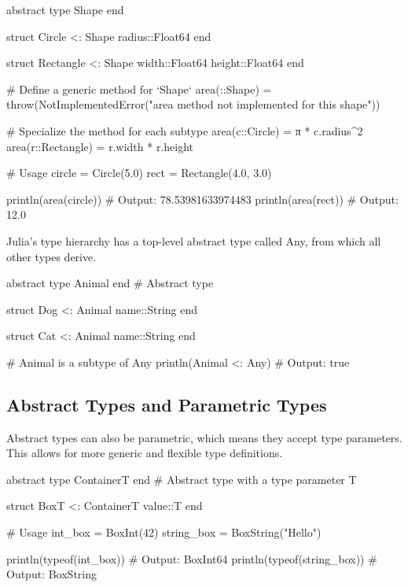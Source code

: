 \documentclass{report}
\begin{document}
     \bigbreak \noindent 
     \begin{jlcode}
 abstract type Shape end

struct Circle <: Shape
    radius::Float64
end

struct Rectangle <: Shape
    width::Float64
    height::Float64
end

# Define a generic method for `Shape`
area(::Shape) = throw(NotImplementedError("area method not implemented for this shape"))

# Specialize the method for each subtype
area(c::Circle) = π * c.radius^2
area(r::Rectangle) = r.width * r.height

# Usage
circle = Circle(5.0)
rect = Rectangle(4.0, 3.0)

println(area(circle))  # Output: 78.53981633974483
println(area(rect))    # Output: 12.0
     \end{jlcode}

     \bigbreak \noindent 
     Julia’s type hierarchy has a top-level abstract type called Any, from which all other types derive.
     \bigbreak \noindent 
     \begin{jlcode}
 abstract type Animal end  # Abstract type

struct Dog <: Animal
    name::String
end

struct Cat <: Animal
    name::String
end

# Animal is a subtype of Any
println(Animal <: Any)  # Output: true
     \end{jlcode}

     \bigbreak \noindent 
     \subsection{Abstract Types and Parametric Types}
     \bigbreak \noindent 
     Abstract types can also be parametric, which means they accept type parameters. This allows for more generic and flexible type definitions.
     \bigbreak \noindent 
     \begin{jlcode}
abstract type Container{T} end  # Abstract type with a type parameter T

struct Box{T} <: Container{T}
    value::T
end

# Usage
int_box = Box{Int}(42)
string_box = Box{String}("Hello")

println(typeof(int_box))  # Output: Box{Int64}
println(typeof(string_box))  # Output: Box{String}
     \end{jlcode}

     \bigbreak \noindent 
\end{document}
